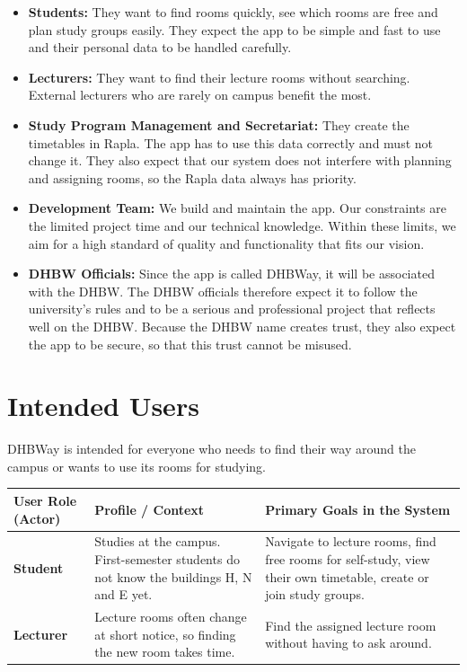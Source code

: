 \documentclass[11pt, a4paper]{article}
\begin{document}
\begin{itemize}
    \item \textbf{Students:} They want to find rooms quickly, see which rooms are free
    and plan study groups easily. They expect the app to be simple and fast to use
    and their personal data to be handled carefully.

    \item \textbf{Lecturers:} They want to find their lecture
    rooms without searching. External lecturers who are rarely on campus benefit the most.

    \item \textbf{Study Program Management and Secretariat:} They create the timetables
    in Rapla. The app has to use this data correctly and must not change it. They also
    expect that our system does not interfere with planning and assigning rooms, so the
    Rapla data always has priority.


    \item \textbf{Development Team:} We build and maintain the app. Our constraints are
    the limited project time and our technical knowledge. Within these limits, we aim for
    a high standard of quality and functionality that fits our vision.

    \item \textbf{DHBW Officials:} Since the app is called DHBWay, it will be associated
    with the DHBW. The DHBW officials therefore expect it to follow the university's rules
    and to be a serious and professional project that reflects well on the DHBW.
    Because the DHBW name creates trust, they also expect the app to be secure, so that
    this trust cannot be misused.


\end{itemize}

\section{Intended Users}
DHBWay is intended for everyone who needs to find their way around the campus or wants to use its rooms for studying. 
\vspace{1em}

\noindent
\begin{tabularx}{\textwidth}{l X X}
    \toprule
    \textbf{User Role (Actor)} & \textbf{Profile / Context} & \textbf{Primary Goals in the System} \\
    \midrule
    \textbf{Student} & Studies at the campus. First-semester students do not know the buildings H, N and E yet. & Navigate to lecture rooms, find free rooms for self-study, view their own timetable, create or join study groups. \\
    \addlinespace
    \textbf{Lecturer} & Lecture rooms often change at short notice, so finding the new room takes time. & Find the assigned lecture room without having to ask around. \\
    \bottomrule
\end{tabularx}
\end{document}
